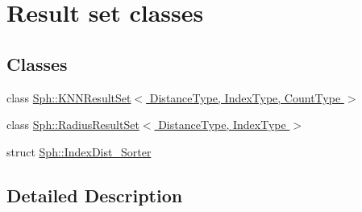 \hypertarget{group__result__sets__grp}{}\section{Result set classes}
\label{group__result__sets__grp}
\subsection*{Classes}
\begin{DoxyCompactItemize}
\item 
class \hyperlink{classSph_1_1KNNResultSet}{Sph\+::\+K\+N\+N\+Result\+Set$<$ Distance\+Type, Index\+Type, Count\+Type $>$}
\item 
class \hyperlink{classSph_1_1RadiusResultSet}{Sph\+::\+Radius\+Result\+Set$<$ Distance\+Type, Index\+Type $>$}
\item 
struct \hyperlink{structSph_1_1IndexDist__Sorter}{Sph\+::\+Index\+Dist\+\_\+\+Sorter}
\end{DoxyCompactItemize}


\subsection{Detailed Description}
